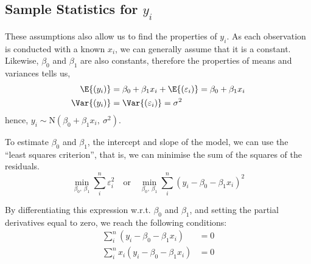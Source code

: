 \documentclass{article}
\begin{document}
\subsection{Sample Statistics for \texorpdfstring{$y_i$}{yi}}
These assumptions also allow us to find the properties of $y_i$. As each observation is conducted with a known $x_i$, we can generally assume that it is a constant.
Likewise, $\beta_0$ and $\beta_1$ are also constants, therefore the properties of means and variances tells us,
\begin{align*}
    \E{\left( y_i \right)}   & = \beta_0 + \beta_1 x_i + \E{\left( \varepsilon_i \right)} = \beta_0 + \beta_1 x_i \\
    \Var{\left( y_i \right)} & = \Var{\left( \varepsilon_i \right)} = \sigma^2
\end{align*}
hence, $y_i \sim \mathrm{N}\left( \beta_0 + \beta_1 x_i,\: \sigma^2 \right)$.
\begin{definition}
    To estimate $\beta_0$ and $\beta_1$, the intercept and slope of the model,
    we can use the ``least squares criterion'',
    that is, we can minimise the sum of the squares of the residuals.
    \begin{equation*}
        \min_{\beta_0,\: \beta_1}\sum_i^n \varepsilon_i^2 \quad \text{or} \quad \min_{\beta_0,\: \beta_1}\sum_i^n \left( y_i - \beta_0 - \beta_1 x_i \right)^2
    \end{equation*}
\end{definition}
By differentiating this expression w.r.t. $\beta_0$ and $\beta_1$, and setting the partial derivatives equal to zero, we reach the following conditions:
\begin{align*}
    \sum_i^n \left( y_i - \beta_0 - \beta_1 x_i \right)    & = 0 \\
    \sum_i^n x_i\left( y_i - \beta_0 - \beta_1 x_i \right) & = 0
\end{align*}
\end{document}
